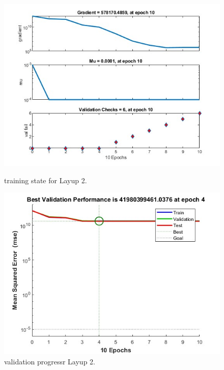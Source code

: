 \begin{figure}[h]
    \centering
    \begin{minipage}{0.45\textwidth}
        \centering
        \includegraphics[width=\linewidth]{train_2.jpg}
        \caption{training state for Layup 2.}
    \end{minipage}
    \hfill
    \begin{minipage}{0.45\textwidth}
        \centering
        \includegraphics[width=\linewidth]{train_22.jpg}
        \caption{validation progressr Layup 2.}
    \end{minipage}
\end{figure}

